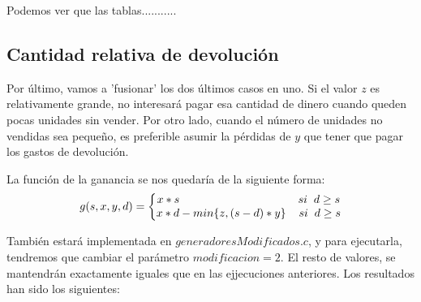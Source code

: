 \documentclass[11pt,a4paper]{report}
\begin{document}
Podemos ver que las tablas...........


\subsection{Cantidad relativa de devolución}

Por último, vamos a 'fusionar' los dos últimos casos en uno. Si el valor $z$ es relativamente grande, no interesará pagar esa cantidad
de dinero cuando queden pocas unidades sin vender. Por otro lado, cuando el número de unidades no vendidas sea pequeño, es preferible asumir
la pérdidas de $y$ que tener que pagar los gastos de devolución.

La función de la ganancia se nos quedaría de la siguiente forma:
\begin{equation}
	g(s,x,y,d)=\left\{\begin{matrix}
	x*s\hspace{37mm}si\hspace{2mm}d\geq s\\ 
	x*d-min\{z,(s-d)*y\}\hspace{4mm}si\hspace{2mm}d\geq s
	\end{matrix}\right.
\end{equation}

También estará implementada en $generadoresModificados.c$, y para ejecutarla, tendremos que cambiar el parámetro $modificacion=2$. El resto
de valores, se mantendrán exactamente iguales que en las ejjecuciones anteriores. Los resultados han sido los siguientes:
\end{document}
